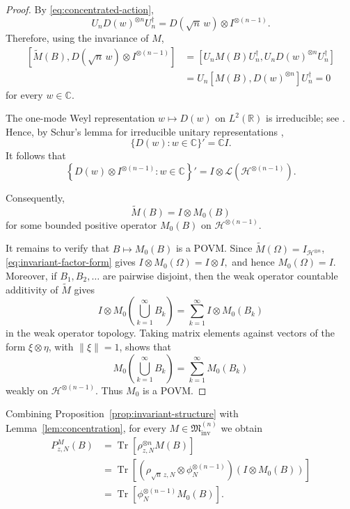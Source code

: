 \documentclass{article}
\theoremstyle{named}
\theoremstyle{named1}
\newcommand{\Tr}{\operatorname{Tr}}
\newcommand{\bbC}{\mathbb C}
\newcommand{\cM}{\mathfrak M}
\newcommand{\cH}{\mathcal H}
\theoremstyle{plain}
\theoremstyle{remark}
\begin{document}
\begin{proof}
By \eqref{eq:concentrated-action},
\[
    U_nD(w)^{\otimes n}U_n^\dagger
    =
    D(\sqrt n\,w)\otimes I^{\otimes(n-1)}.
\]
Therefore, using the invariance of $M$,
\begin{align*}
\left[
    \widetilde M(B),
    D(\sqrt n\,w)\otimes I^{\otimes(n-1)}
\right]
&=
\left[
    U_nM(B)U_n^\dagger,
    U_nD(w)^{\otimes n}U_n^\dagger
\right]
\\
&=
U_n
\left[
    M(B),
    D(w)^{\otimes n}
\right]
U_n^\dagger
=
0
\end{align*}
for every $w\in\bbC$.

The one-mode Weyl representation
$w\mapsto D(w)$ on $L^2(\mathbb R)$ is irreducible; see
\cite[Chapter~1, Sections~3 and~5]{Folland1989}.
Hence, by Schur's lemma for irreducible unitary representations
\cite[Theorem~3.5]{FollandAbstract},
\[
    \{D(w):w\in\bbC\}'
    =
    \bbC I.
\]
It follows that
\begin{equation}
    \left\{
        D(w)\otimes I^{\otimes(n-1)}
        :
        w\in\bbC
    \right\}'
    =
    I\otimes
    \mathcal L\!\left(\cH^{\otimes(n-1)}\right).
    \label{eq:weyl-tensor-commutant}
\end{equation}

Consequently,
\[
    \widetilde M(B)
    =
    I\otimes M_0(B)
\]
for some bounded positive operator $M_0(B)$ on
$\cH^{\otimes(n-1)}$.

It remains to verify that $B\mapsto M_0(B)$ is a POVM. Since
$
    \widetilde M(\Omega)
    =
    I_{\cH^{\otimes n}}$,  \eqref{eq:invariant-factor-form} gives
$
    I\otimes M_0(\Omega)
    =
    I\otimes I,
$
and hence
$
    M_0(\Omega)=I.
$
Moreover, if $B_1,B_2,\ldots$ are pairwise disjoint, then the weak
operator countable additivity of $\widetilde M$ gives
\[
    I\otimes
    M_0\!\left(\bigcup_{k=1}^{\infty}B_k\right)
    =
    \sum_{k=1}^{\infty}
    I\otimes M_0(B_k)
\]
in the weak operator topology. Taking matrix elements against vectors of
the form $\xi\otimes\eta$, with $\|\xi\|=1$, shows that
\[
    M_0\!\left(\bigcup_{k=1}^{\infty}B_k\right)
    =
    \sum_{k=1}^{\infty}M_0(B_k)
\]
weakly on $\cH^{\otimes(n-1)}$. Thus $M_0$ is a POVM.
\end{proof}

Combining Proposition~\ref{prop:invariant-structure} with
Lemma~\ref{lem:concentration}, for every
$M\in\cM_{\mathrm{inv}}^{(n)}$ we obtain
\begin{align}
    P_{z,N}^{M}(B)
    &=
    \Tr\!\left[
        \rho_{z,N}^{\otimes n}M(B)
    \right]
    \nonumber\\
    &=
    \Tr\!\left[
        \left(
            \rho_{\sqrt n\,z,N}
            \otimes
            \phi_N^{\otimes(n-1)}
        \right)
        \left(
            I\otimes M_0(B)
        \right)
    \right]
    \nonumber\\
    &=
    \Tr\!\left[
        \phi_N^{\otimes(n-1)}
        M_0(B)
    \right].
    \label{eq:reduced-outcome-law}
\end{align}
\end{document}
